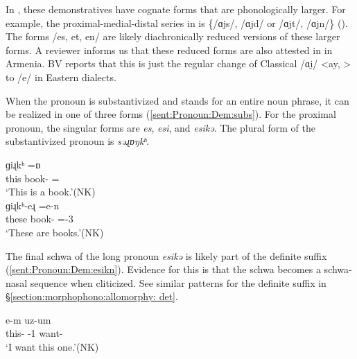 
In {\seaSEA}, these demonstratives have cognate forms that are phonologically larger. For example, the proximal-medial-distal series in {\seaSEA} is \{/ɑjs/, /ɑjd/ or /ɑjt/, /ɑjn/\} (). The {\iaIA} forms /es, et, en/    are likely diachronically reduced versions of these larger {\seaSEA} forms. A reviewer informs us that these reduced forms are also attested in {\seaCEA} in Armenia.  BV reports that this is just the regular change of Classical /ɑi̯/ <ay,  > to /e/  in Eastern dialects. 


When the   pronoun is substantivized and stands for an entire noun phrase, it   can be realized in one of three forms (\ref{sent:Pronoun:Dem:subs}). For the proximal pronoun, the singular forms are   \textit{{es}}, \textit{{esi}}, and \textit{{esikə}}. The plural form of the substantivized pronoun is \textit{{səɻɒŋkʰ}}.

\begin{exe}
	\ex \label{sent:Pronoun:Dem:subs}
	\begin{xlist}
		
		\ex {} {ɡiɻkʰ} ={ɒ}  
		\\
		this book-{}  ={\auxgloss}
		\\
		\trans		`This is a book.'\hfill (NK)
		\\
		\ex {} {ɡiɻkʰ-eɻ} {=e-n}  
		\\
		these book-{\pl} ={\auxgloss}-3{\pl}
		\\
		\trans		`These are books.'\hfill (NK)
		\\
		
	\end{xlist}
\end{exe}



The final schwa of the long pronoun \textit{{esikə}} is likely part of the definite suffix (\ref{sent:Pronoun:Dem:esikn}). Evidence for this is that the schwa becomes a schwa-nasal sequence when cliticized. See similar patterns for the definite suffix in \S\ref{section:morphophono:allomorphy: det}. 

\begin{exe}
	\ex {} {e-m} {uz-um}
	\\
	this-{} {\auxgloss}-1{\sg} want-{\impfcvb}
	\\
	\trans		`I want this one.'\hfill (NK) \label{sent:Pronoun:Dem:esikn}
	\\
\end{exe} 

